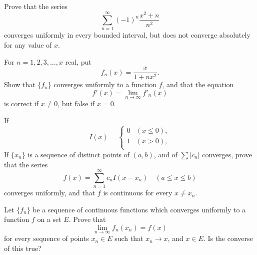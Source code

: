 \begin{myexercise}
    \label{ex:7.6}
    Prove that the series 
    \begin{equation*}
        \sum_{n=1}^{\infty} (-1)^n \frac{x^2+n}{n^2}
    \end{equation*}
    converges uniformly in every bounded interval, but does not converge absolutely for any value of $x$.
\end{myexercise}


\begin{myexercise}
    \label{ex:7.7}
    For $n=1,2,3,...,x$ real, put 
    \begin{equation*}
        f_n(x) = \frac{x}{1+nx^2}.
    \end{equation*}
    Show that $\{f_n\}$ converges uniformly to a function $f$, and that the equation
    \begin{equation*}
        f'(x) = \lim_{n \to \infty} f'_n(x)
    \end{equation*}
    is correct if $x \neq 0$, but false if $x=0$.
\end{myexercise}


\begin{myexercise}
    \label{ex:7.8}
    If 
    \begin{equation*}
        I(x) = \left\{ 
            \begin{array}{ll}
                0 & (x \leq 0), \\
                1 & (x >    0), \\
            \end{array}
         \right.
    \end{equation*}
    If $\{x_n\}$ is a sequence of distinct points of $(a,b)$, and of $\sum |c_n|$ converges, prove that the series 
    \begin{equation*}
        f(x) = \sum_{n=1}^{\infty} c_n I(x-x_n) \quad 
        (a \leq x \leq b)
    \end{equation*}
    converges uniformly, and that $f$ is continuous for every $x \neq x_n$.
\end{myexercise}


\begin{myexercise}
    \label{ex:7.9}
    Let $\{f_n\}$ be a sequence of continuous functions which converges uniformly to a function $f$ on a set $E$.
    Prove that 
    \begin{equation*}
        \lim_{n \to \infty} f_n (x_n) = f(x)
    \end{equation*}
    for every sequence of points $x_n \in E$ such that $x_n \rightarrow x$, and $x \in E$.
    Is the converse of this true?
\end{myexercise}


